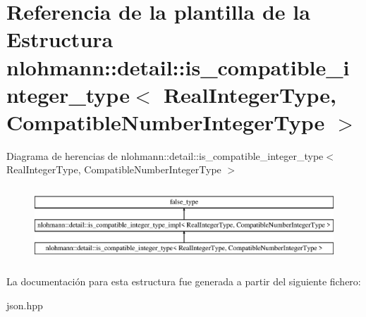 \hypertarget{structnlohmann_1_1detail_1_1is__compatible__integer__type}{}\section{Referencia de la plantilla de la Estructura nlohmann\+:\+:detail\+:\+:is\+\_\+compatible\+\_\+integer\+\_\+type$<$ Real\+Integer\+Type, Compatible\+Number\+Integer\+Type $>$}
\label{structnlohmann_1_1detail_1_1is__compatible__integer__type}
Diagrama de herencias de nlohmann\+:\+:detail\+:\+:is\+\_\+compatible\+\_\+integer\+\_\+type$<$ Real\+Integer\+Type, Compatible\+Number\+Integer\+Type $>$\begin{figure}[H]
\begin{center}
\leavevmode
\includegraphics[height=2.818792cm]{structnlohmann_1_1detail_1_1is__compatible__integer__type}
\end{center}
\end{figure}


La documentación para esta estructura fue generada a partir del siguiente fichero\+:\begin{DoxyCompactItemize}
\item 
json.\+hpp\end{DoxyCompactItemize}
